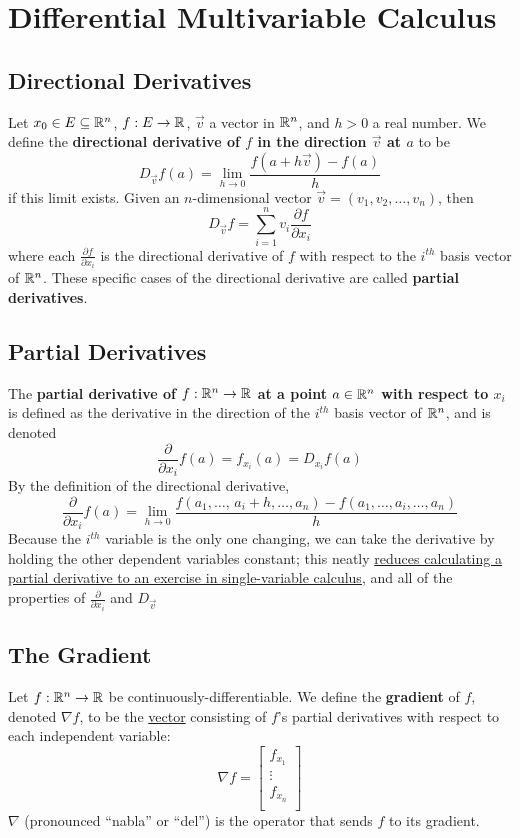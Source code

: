 \section{Differential Multivariable Calculus}

\subsection{Directional Derivatives}

Let $x_0 \in E \subseteq \mathbb{R}^n$, $f : E \to \mathbb{R}$, $\vec{v}$ a vector in $\mathbb{R}^n$, and $h > 0$ a real number. We define the \textbf{directional derivative of $f$ in the direction $\vec{v}$ at $a$} to be $$D_{\vec{v}}f(a) = \lim_{h \to 0} \frac{f(a + h\vec{v}) - f(a)}{h}$$ if this limit exists. Given an $n$-dimensional vector $\vec{v} = (v_1, v_2, \ldots, v_n)$, then $$D_{\vec{v}}f = \sum_{i = 1}^n v_i\frac{\partial f}{\partial x_i} $$ where each $\frac{\partial f}{\partial x_i}$ is the directional derivative of $f$ with respect to the $i^{th}$ basis vector of $\mathbb{R}^n$. These specific cases of the directional derivative are called \textbf{partial derivatives}.

\subsection{Partial Derivatives}

The \textbf{partial derivative of $f : \mathbb{R}^n \to \mathbb{R}$ at a point $a \in \mathbb{R}^n$ with respect to $x_i$} is defined as the derivative in the direction of the $i^{th}$ basis vector of $\mathbb{R}^n$, and is denoted $$\frac{\partial}{\partial x_i} f(a) = f_{x_i}(a) = D_{x_i}f(a)$$ By the definition of the directional derivative, $$ \frac{\partial }{\partial x_i} f(a) = \lim_{h \to 0} \frac{f(a_1, \ldots, \, a_i + h, \ldots, a_n) - f(a_1, \ldots, a_i, \ldots, a_n)}{h}$$ Because the $i^{th}$ variable is the only one changing, we can take the derivative by holding the other dependent variables constant; this neatly \uline{reduces calculating a partial derivative to an exercise in single-variable calculus,} and all of the properties of $\frac{\partial}{\partial x_i}$ and $D_{\vec{v}}$

\subsection{The Gradient}

Let $f: \mathbb{R}^n \to \mathbb{R}$ be continuously-differentiable. We define the \textbf{gradient} of $f$, denoted $\nabla f$, to be the \uline{vector} consisting of $f$'s partial derivatives with respect to each independent variable: $$ \nabla f =
\begin{bmatrix}
f_{x_1}\\
\vdots\\
f_{x_n}\\
\end{bmatrix}$$ $\nabla$ (pronounced ``nabla'' or ``del'') is the operator that sends $f$ to its gradient.

